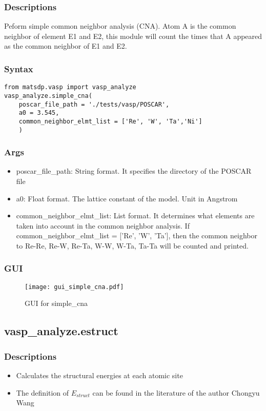 \documentclass[12pt]{book}
\begin{document}
\subsubsection{Descriptions}
Peform simple common neighbor analysis (CNA). Atom A is the common neighbor of element E1 and E2, this module will count the times that A appeared as the common neighbor of E1 and E2.
\subsubsection{Syntax}
\begin{lstlisting}
from matsdp.vasp import vasp_analyze
vasp_analyze.simple_cna(
    poscar_file_path = './tests/vasp/POSCAR',
    a0 = 3.545,
    common_neighbor_elmt_list = ['Re', 'W', 'Ta','Ni']
    )
\end{lstlisting}
\subsubsection{Args}
\begin{itemize}
\item poscar\_file\_path: String format. It specifies the directory of the POSCAR file
\item a0: Float format. The lattice constant of the model. Unit in Angstrom
\item common\_neighbor\_elmt\_list: List format. It determines what elements are taken into account in the common neighbor analysis. If common\_neighbor\_elmt\_list = ['Re', 'W', 'Ta'], then the common neighbor to Re-Re, Re-W, Re-Ta, W-W, W-Ta, Ta-Ta will be counted and printed.
\end{itemize}

\subsubsection{GUI}
\begin{figure}[htbp]
\centering
\texttt{[image: gui\_simple\_cna.pdf]}
\caption{GUI for simple\_cna}
\label{fig:GUI_simple_cna}
\end{figure}

\subsection{vasp\_analyze.estruct}
\subsubsection{Descriptions}
\begin{itemize}
\item Calculates the structural energies at each atomic site
\item The definition of $E_{struct}$ can be found in the literature of the author Chongyu Wang \cite{Chongyu1988PRB38, Chong-yu1990PRB41}
\end{itemize}
\end{document}

